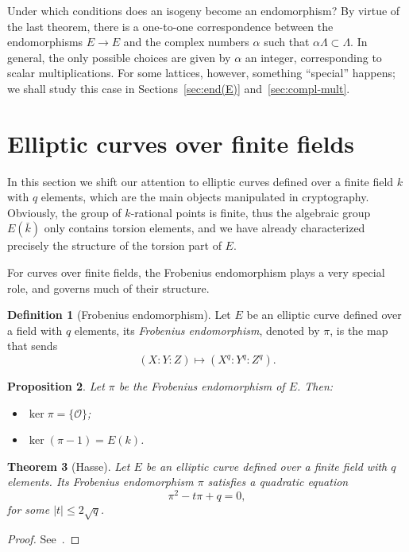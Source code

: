 \documentclass[10pt]{article}
\theoremstyle{plain}
\newtheorem{theorem}{Theorem}
\newtheorem{proposition}[theorem]{Proposition}
\theoremstyle{definition}
\newtheorem{definition}[theorem]{Definition}
\def\O{\ensuremath{\mathcal{O}}}
\begin{document}
Under which conditions does an isogeny become an endomorphism? By
virtue of the last theorem, there is a one-to-one correspondence
between the endomorphisms $E\to E$ and the complex numbers $α$ such
that $αΛ⊂Λ$. %
In general, the only possible choices are given by $α$ an integer,
corresponding to scalar multiplications. %
For some lattices, however, something ``special'' happens; we shall
study this case in Sections~\ref{sec:end(E)} and~\ref{sec:compl-mult}.



\section{Elliptic curves over finite fields}
\label{sec:ec-over-ff}

In this section we shift our attention to elliptic curves defined over
a finite field $k$ with $q$ elements, which are the main objects
manipulated in cryptography. %
Obviously, the group of $k$-rational points is finite, thus the
algebraic group $E(\bar{k})$ only contains torsion elements, and we
have already characterized precisely the structure of the torsion part
of $E$.

For curves over finite fields, the Frobenius endomorphism plays a very
special role, and governs much of their structure.

\begin{definition}[Frobenius endomorphism]
  Let $E$ be an elliptic curve defined over a field with $q$ elements,
  its \emph{Frobenius endomorphism}, denoted by $π$, is the map that
  sends
  \[(X:Y:Z) \mapsto (X^q:Y^q:Z^q).\]
\end{definition}

\begin{proposition}
  \label{th:frob}
  Let $π$ be the Frobenius endomorphism of $E$. Then:
  \begin{itemize}
  \item $\ker π = \{\O\}$;
  \item $\ker (π-1) = E(k)$.
  \end{itemize}
\end{proposition}

\begin{theorem}[Hasse]
  Let $E$ be an elliptic curve defined over a finite field with $q$
  elements. %
  Its Frobenius endomorphism $π$ satisfies a quadratic equation
  \begin{equation}
    \label{eq:frob}
    π^2 - tπ + q = 0,
  \end{equation}
  for some $|t|≤2\sqrt{q}$.
\end{theorem}
\begin{proof}
  See~\cite[V, Th.~2.3.1]{silverman:elliptic}.
\end{proof}
\end{document}

